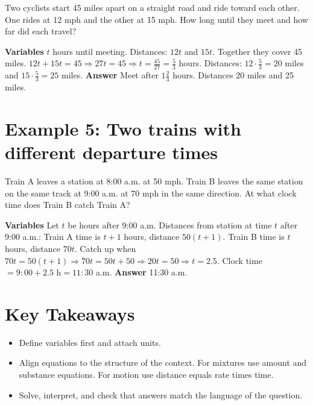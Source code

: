 \documentclass[12pt]{article}
\begin{document}
Two cyclists start 45 miles apart on a straight road and ride toward each other. One rides at 12 mph and the other at 15 mph. How long until they meet and how far did each travel?

\textbf{Variables} \(t\) hours until meeting.  
Distances: \(12t\) and \(15t\). Together they cover 45 miles.  
\(12t + 15t = 45 \Rightarrow 27t = 45 \Rightarrow t = \tfrac{45}{27} = \tfrac{5}{3}\) hours.  
Distances: \(12 \cdot \tfrac{5}{3} = 20\) miles and \(15 \cdot \tfrac{5}{3} = 25\) miles.  
\textbf{Answer} Meet after \(1\tfrac{2}{3}\) hours. Distances 20 miles and 25 miles.

\section*{Example 5: Two trains with different departure times}

Train A leaves a station at 8:00 a.m. at 50 mph. Train B leaves the same station on the same track at 9:00 a.m. at 70 mph in the same direction. At what clock time does Train B catch Train A?

\textbf{Variables} Let \(t\) be hours after 9:00 a.m.  
Distances from station at time \(t\) after 9:00 a.m.:  
Train A time is \(t + 1\) hours, distance \(50(t + 1)\).  
Train B time is \(t\) hours, distance \(70t\).  
Catch up when \(70t = 50(t + 1)\Rightarrow 70t = 50t + 50 \Rightarrow 20t = 50 \Rightarrow t = 2.5\).  
Clock time \(= 9{:}00 + 2.5\text{ h} = 11{:}30\) a.m.  
\textbf{Answer} 11:30 a.m.

\section*{Key Takeaways}
\begin{itemize}
  \item Define variables first and attach units.
  \item Align equations to the structure of the context. For mixtures use amount and substance equations. For motion use distance equals rate times time.
  \item Solve, interpret, and check that answers match the language of the question.
\end{itemize}

\newpage

\end{document}

